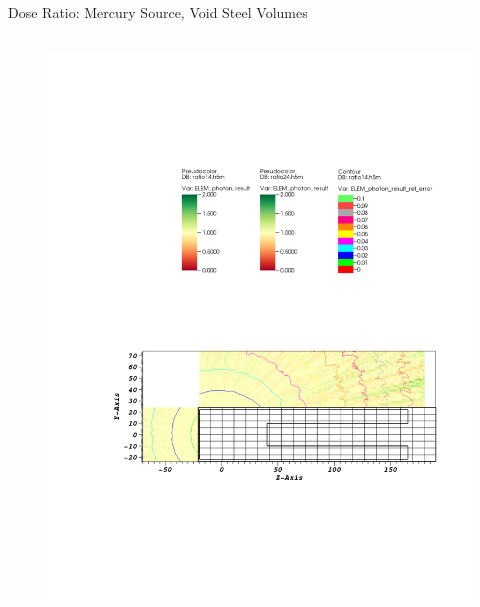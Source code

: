 \documentclass{beamer}
\begin{document}
\begin{frame}{Dose Ratio: Mercury Source, Void Steel Volumes}
\begin{columns}[T]
\begin{figure}
                \includegraphics[scale=0.49,trim={20cm 16.5cm 7cm 6cm},clip]{figs/ratio_mer_void.pdf}
        \end{figure}

\end{columns}
\end{frame}

\end{document}
